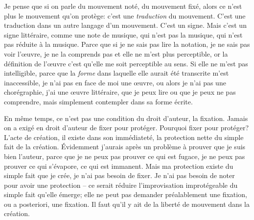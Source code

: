 {Je pense que si on parle du mouvement not\'e, du mouvement
fix\'e, alors ce n'est plus le mouvement qu'on prot\`ege: c'est une
{\em traduction} du mouvement. C'est une traduction dans un autre
langage d'un mouvement. C'est un signe. Mais c'est un signe
litt\'eraire, comme une note de musique, qui n'est pas la musique, qui
n'est pas r\'eduite \`a la musique. Parce que si je ne sais pas lire la
notation, je ne sais pas voir l'{\oe}uvre, je ne la comprends pas et
elle ne m'est plus perceptible, or la d\'efinition de l'{\oe}uvre
c'est qu'elle me soit perceptible au
sens. Si elle ne m'est pas intelligible, parce que
la {\em forme} dans laquelle elle aurait \'et\'e transcrite m'est inaccessible, je n'ai pas en face de moi une
{\oe}uvre, ou alors je n'ai pas une chor\'egraphie, j'ai une {\oe}uvre
litt\'eraire, que je peux lire ou que je peux ne pas comprendre, mais
simplement contempler dans sa forme \'ecrite.\par 

En m\^eme temps, ce n'est pas une condition du droit d'auteur, la
fixation. Jamais on a exig\'e en droit d'auteur de fixer pour
prot\'eger. Pourquoi fixer pour prot\'eger? L'acte de cr\'eation, il
existe dans son imm\'ediatet\'e, la protection nette du simple fait de
la cr\'eation. \'Evidemment j'aurais apr\`es un probl\`eme \`a prouver
que je suis bien l'auteur, parce que je ne peux pas prouver ce qui est
fugace, je ne peux pas prouver ce qui s'\'evapore, ce qui est immanent.
Mais ma protection existe du simple fait que je cr\'ee, je n'ai pas
besoin de fixer. Je n'ai pas besoin de noter pour avoir une protection
{--} ce serait r\'eduire l'improvisation improt\'egeable du simple fait
qu'elle \'emerge; elle ne peut pas demander pr\'ealablement une
fixation, ou a posteriori, une fixation. Il faut qu'il y ait de la
libert\'e de mouvement dans la cr\'eation.\par

}
